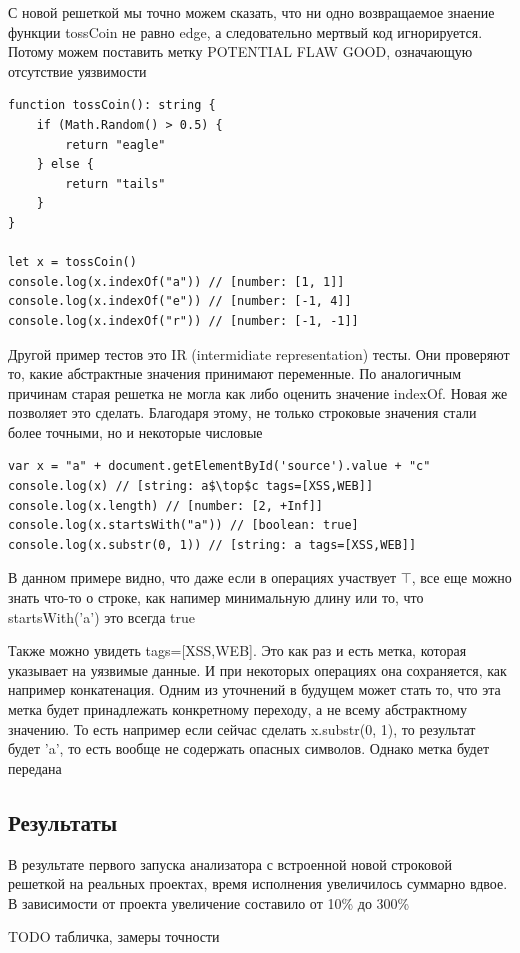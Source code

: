 С новой решеткой мы точно можем сказать, что ни одно возвращаемое знаение функции tossCoin не равно edge, а следовательно мертвый код игнорируется. Потому можем поставить метку POTENTIAL FLAW GOOD, означающую отсутствие уязвимости

\newpage
\begin{lstlisting}[caption={Пример IR тестов}]
function tossCoin(): string {
    if (Math.Random() > 0.5) {
        return "eagle"
    } else {
        return "tails"
    }
}

let x = tossCoin()
console.log(x.indexOf("a")) // [number: [1, 1]]
console.log(x.indexOf("e")) // [number: [-1, 4]]
console.log(x.indexOf("r")) // [number: [-1, -1]]
\end{lstlisting}

Другой пример тестов это IR (intermidiate representation) тесты. Они проверяют то, какие абстрактные значения принимают переменные. По аналогичным причинам старая решетка не могла как либо оценить значение indexOf. Новая же позволяет это сделать. Благодаря этому, не только строковые значения стали более точными, но и некоторые числовые


\begin{lstlisting}[mathescape=true, caption={Еще пример IR тестов}]
var x = "a" + document.getElementById('source').value + "c"
console.log(x) // [string: a$\top$c tags=[XSS,WEB]]
console.log(x.length) // [number: [2, +Inf]]
console.log(x.startsWith("a")) // [boolean: true]
console.log(x.substr(0, 1)) // [string: a tags=[XSS,WEB]]
\end{lstlisting}

В данном примере видно, что даже если в операциях участвует $\top$, все еще можно знать что-то о строке, как напимер минимальную длину или то, что startsWith('a') это всегда true

Также можно увидеть tags=[XSS,WEB]. Это как раз и есть метка, которая указывает на уязвимые данные. И при некоторых операциях она сохраняется, как например конкатенация. Одним из уточнений в будущем может стать то, что эта метка будет принадлежать конкретному переходу, а не всему абстрактному значению. То есть например если сейчас сделать x.substr(0, 1), то результат будет 'a', то есть вообще не содержать опасных символов. Однако метка будет передана


\newpage
\subsection{Результаты}
В результате первого запуска анализатора с встроенной новой строковой решеткой на реальных проектах, время исполнения увеличилось суммарно вдвое. В зависимости от проекта увеличение составило от 10\% до 300\%

TODO табличка, замеры точности

